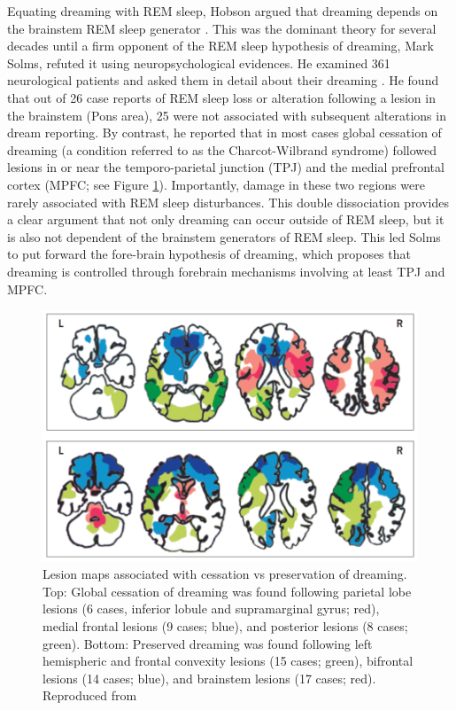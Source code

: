 Equating dreaming with REM sleep, Hobson argued that dreaming depends on the brainstem REM sleep generator \citep{hobson_dream_1998}. This was the dominant theory for several decades until a firm opponent of the REM sleep hypothesis of dreaming, Mark Solms, refuted it using neuropsychological evidences. He examined 361 neurological patients and asked them in detail about their dreaming \cite{solms_neuropsychology_1997}. He found that out of 26 case reports of REM sleep loss or alteration following a lesion in the brainstem (Pons area), 25 were not associated with subsequent alterations in dream reporting. By contrast, he reported that in most cases global cessation of dreaming (a condition referred to as the Charcot-Wilbrand syndrome) followed lesions in or near the temporo-parietal junction (TPJ) and the medial prefrontal cortex (MPFC; see Figure \ref{fig:intro:lesions}). Importantly, damage in these two regions were rarely associated with REM sleep disturbances. This double dissociation provides a clear argument that not only dreaming can occur outside of REM sleep, but it is also not dependent of the brainstem generators of REM sleep. This led Solms to put forward the fore-brain hypothesis of dreaming, which proposes that dreaming is controlled through forebrain mechanisms involving at least TPJ and MPFC.

\begin{figure}[htb]
	\includegraphics[width=\textwidth]{Fig/Intro/Intro_Lesions/Intro_Lesions.png}
	\caption[Lesion maps associated with cessation vs preservation of dreaming]{Lesion maps associated with cessation vs preservation of dreaming. Top: Global cessation of dreaming was found following parietal lobe lesions (6 cases, inferior lobule and supramarginal gyrus; red), medial frontal lesions (9 cases; blue), and posterior lesions (8 cases; green). Bottom: Preserved dreaming was found following left hemispheric and frontal convexity lesions (15 cases; green), bifrontal lesions (14 cases; blue), and brainstem lesions (17 cases; red). Reproduced from \citet{schwartz_dreaming:_2005}}
	\label{fig:intro:lesions}
\end{figure}

